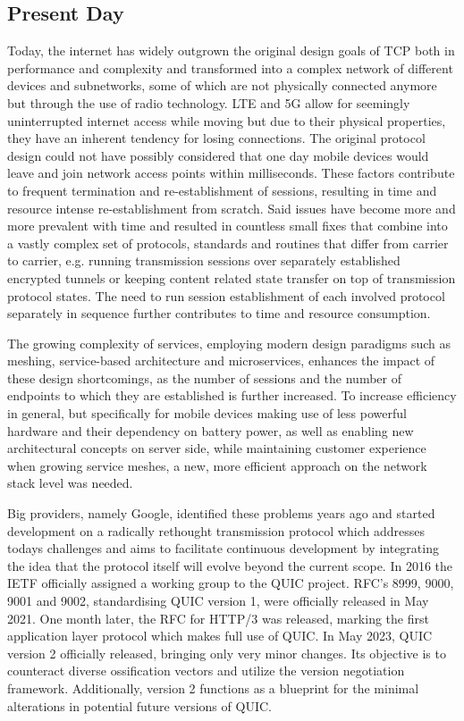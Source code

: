 \subsection{Present Day}

Today, the internet has widely outgrown the original design goals of TCP both in performance and complexity and transformed into a
complex network of different devices and subnetworks, some of which are not physically connected anymore but through the use of
radio technology. LTE and 5G allow for seemingly uninterrupted internet access while moving but due to their physical properties,
they have an inherent tendency for losing connections. The original protocol design could not have possibly considered that one day
mobile devices would leave and join network access points within milliseconds. These factors contribute to frequent termination and
re-establishment of sessions, resulting in time and resource intense re-establishment from scratch. Said issues have become more and
more prevalent with time and resulted in countless small fixes that combine into a vastly complex set of protocols, standards and
routines that differ from carrier to carrier, e.g. running transmission sessions over separately established encrypted tunnels or
keeping content related state transfer on top of transmission protocol states. The need to run session establishment of each involved
protocol separately in sequence further contributes to time and resource consumption.

The growing complexity of services, employing modern design paradigms such as meshing, service-based architecture and microservices,
enhances the impact of these design shortcomings, as the number of sessions and the number of endpoints to which they are established
is further increased. To increase efficiency in general, but specifically for mobile devices making use of less powerful hardware and
their dependency on battery power, as well as enabling new architectural concepts on server side, while maintaining customer
experience when growing service meshes, a new, more efficient approach on the network stack level was needed.

Big providers, namely Google, identified these problems years ago and started development on a radically rethought transmission
protocol which addresses todays challenges and aims to facilitate continuous development by integrating the idea that the protocol
itself will evolve beyond the current scope. In 2016 the IETF officially assigned a working group to the QUIC
project\cite{quic_wg_history}. RFC's 8999\cite{rfc8999}, 9000\cite{rfc9000}, 9001\cite{rfc9001} and 9002\cite{rfc9002}, standardising
QUIC version 1, were officially released in May 2021. One month later, the RFC for HTTP/3 was released, marking the first application
layer protocol which makes full use of QUIC\cite{rfc9114}. In May 2023, QUIC version 2 officially released, bringing only very minor
changes\cite{rfc9369}. Its objective is to counteract diverse ossification vectors and utilize the version negotiation framework.
Additionally, version 2 functions as a blueprint for the minimal alterations in potential future versions of QUIC.

